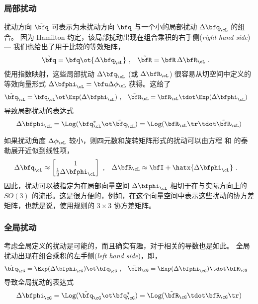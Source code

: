 \subsubsection{局部扰动}

扰动方向 $\tilde{\bfq}$ 可表示为未扰动方向 $\bfq$ 与一个小的局部扰动 ${\Delta\bfq_\cL}$ 的组合。 
因为 Hamilton 约定，该局部扰动出现在组合乘积的右手侧(\emph{right hand side}) --- 我们也给出了用于比较的等效矩阵，
%
\begin{align}
\tilde{\bfq} &= \bfq\ot{\Delta\bfq_\cL}
~, &
\tilde\bfR &= \bfR\,\Delta\bfR_\cL
~.
\end{align}%
%
使用指数映射，这些局部扰动 $\Delta\bfq_\cL$ (或 $\Delta\bfR_\cL$) 很容易从切空间中定义的等效向量形式 $\Delta\bfphi_\cL=\bfu\Delta\phi_\cL$ 获得。这给了
%
\begin{align}
\tilde\bfq_\cL &= \bfq_\cL\ot\Exp(\Delta\bfphi_\cL)
~,& 
\tilde\bfR_\cL &= \bfR_\cL\tdot\Exp(\Delta\bfphi_\cL)
\end{align}
%
导致局部扰动的表达式 
%
\begin{align}
\Delta\bfphi_\cL = \Log(\bfq_\cL^*\ot\tilde\bfq_\cL) = \Log(\bfR_\cL\tr\tdot\tilde\bfR_\cL)
\end{align}
 

如果扰动角度 $\Delta\phi_\cL$ 较小，则四元数和旋转矩阵形式的扰动可以由方程  和  的泰勒展开近似到线性项，
%
\begin{align}
{\Delta\bfq_\cL}& \approx \begin{bmatrix}
1\\\frac{1}{2}\Delta\bfphi_\cL
\end{bmatrix}
~,
&
\Delta\bfR_\cL& \approx
\bfI+\hatx{\Delta\bfphi_\cL}
~.
\end{align}%
%
因此，扰动可以被指定为在局部向量空间 $\Delta\bfphi_\cL$ 相切于在与实际方向上的 $SO(3)$ 的流形。这是很方便的，例如，在这个向量空间中表示这些扰动的协方差矩阵，也就是说，使用规则的 $3\times 3$ 协方差矩阵。

\subsubsection{全局扰动}

考虑全局定义的扰动是可能的，而且确实有趣，对于相关的导数也是如此。 
全局扰动出现在组合乘积的左手侧(\emph{left hand side})，即，
%
%
\begin{align}
\tilde\bfq_\cG &= \Exp(\Delta\bfphi_\cG)\ot\bfq_\cG
~,& 
\tilde\bfR_\cG &= \Exp(\Delta\bfphi_\cG)\tdot\bfR_\cG
\end{align}
%
导致全局扰动的表达式 
%
\begin{align}
\Delta\bfphi_\cG = \Log(\tilde\bfq_\cG\ot\bfq_\cG^*) = \Log(\tilde\bfR_\cG\tdot\bfR_\cG\tr)
\end{align}


